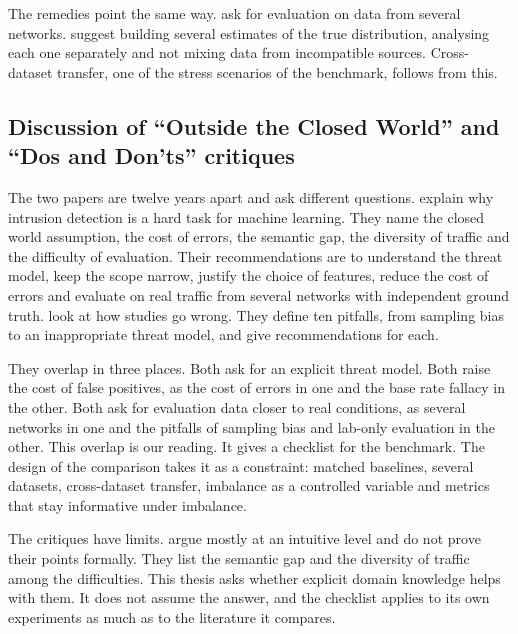The remedies point the same way. \citet{sommer2010outside} ask for
evaluation on data from several networks. \citet{arp2022dosdonts} suggest
building several estimates of the true distribution, analysing each one
separately and not mixing data from incompatible sources. Cross-dataset
transfer, one of the stress scenarios of the benchmark, follows from this.

\subsection{Discussion of ``Outside the Closed World'' and ``Dos and Don'ts'' critiques}
\label{sec:closed-world-dos-donts}

The two papers are twelve years apart and ask different questions.
\citet{sommer2010outside} explain why intrusion detection is a hard task for
machine learning. They name the closed world assumption, the cost of errors,
the semantic gap, the diversity of traffic and the difficulty of evaluation.
Their recommendations are to understand the threat model, keep the scope
narrow, justify the choice of features, reduce the cost of errors and
evaluate on real traffic from several networks with independent ground truth.
\citet{arp2022dosdonts} look at how studies go wrong. They define ten
pitfalls, from sampling bias to an inappropriate threat model, and give
recommendations for each.

They overlap in three places. Both ask for an explicit threat model. Both
raise the cost of false positives, as the cost of errors in one and the base
rate fallacy in the other. Both ask for evaluation data closer to real
conditions, as several networks in one and the pitfalls of sampling bias and
lab-only evaluation in the other. This overlap is our reading. It gives a
checklist for the benchmark. The design of the comparison takes it as a
constraint: matched baselines, several datasets, cross-dataset transfer,
imbalance as a controlled variable and metrics that stay informative under
imbalance.

The critiques have limits. \citet{sommer2010outside} argue mostly at an
intuitive level and do not prove their points formally. They list the
semantic gap and the diversity of traffic among the difficulties. This thesis
asks whether explicit domain knowledge helps with them. It does not assume the
answer, and the checklist applies to its own experiments as much as to the
literature it compares.

